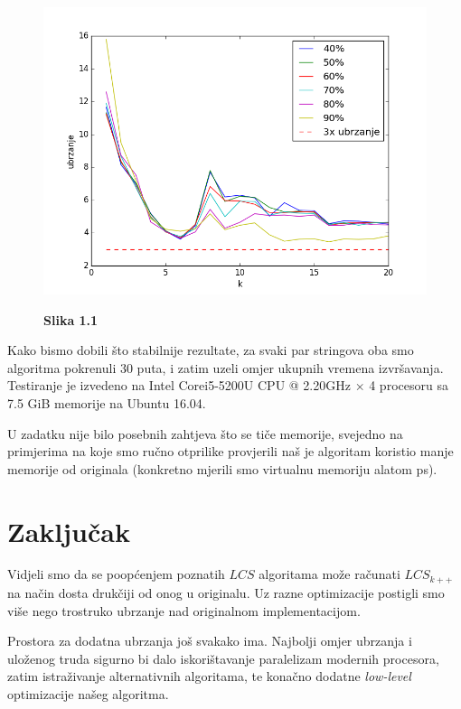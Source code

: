 \documentclass[times, utf8, seminar, numeric]{fer}
\begin{document}
\begin{figure}
  \begin{center}
    \includegraphics{../../test/speedplot.png}
  \end{center}
  \centering
  \textbf{Slika 1.1}  
\end{figure}

Kako bismo dobili što stabilnije rezultate, za svaki par stringova oba
smo algoritma pokrenuli $30$ puta, i zatim uzeli omjer ukupnih vremena
izvršavanja. Testiranje je izvedeno na Intel\textregistered  
Core\texttrademark   i5-5200U CPU @ 2.20GHz $\times$ 4 procesoru sa 7.5
GiB memorije na Ubuntu 16.04.

U zadatku nije bilo posebnih zahtjeva što se tiče memorije, svejedno
na primjerima na koje smo ručno otprilike provjerili naš je
algoritam koristio manje memorije od originala (konkretno mjerili
smo virtualnu memoriju alatom ps).

\chapter{Zaključak}
Vidjeli smo da se poopćenjem poznatih $LCS$ algoritama može 
računati $LCS_{k++}$ na način dosta drukčiji od onog u originalu.
Uz razne optimizacije postigli smo više nego trostruko ubrzanje
nad originalnom implementacijom.

Prostora za dodatna ubrzanja još svakako ima. Najbolji omjer ubrzanja
i uloženog truda sigurno bi dalo iskorištavanje paralelizam modernih
procesora, zatim istraživanje alternativnih algoritama, te konačno
dodatne \emph{low-level} optimizacije našeg algoritma.



\end{document}
